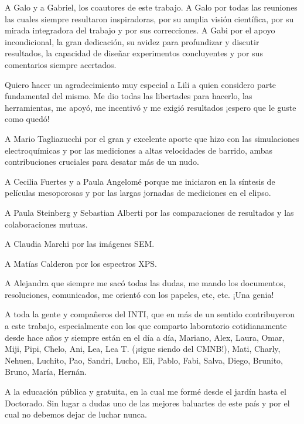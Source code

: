 \begin{myindentpar}{0.5cm}

A Galo y a Gabriel, los coautores de este trabajo. A Galo por todas las reuniones las cuales siempre resultaron inspiradoras, por su amplia visión científica, por su mirada integradora del trabajo y por sus correcciones. \linebreak A Gabi por el apoyo incondicional, la gran dedicación, su avidez para profundizar y discutir resultados, la capacidad de diseñar experimentos concluyentes y por sus comentarios siempre acertados.

Quiero hacer un agradecimiento muy especial a Lili a quien considero parte fundamental del mismo. Me dio todas las libertades para hacerlo, las herramientas, me apoyó, me incentivó y me exigió resultados ¡espero que le guste como quedó!

A Mario Tagliazucchi por el gran y excelente aporte que hizo con las simulaciones electroquímicas y por las mediciones a altas velocidades de barrido, ambas contribuciones cruciales para desatar más de un nudo.  

A Cecilia Fuertes y a Paula Angelomé porque me iniciaron en la síntesis de películas mesoporosas y por las largas jornadas de mediciones en el elipso.

A Paula Steinberg y Sebastian Alberti por las comparaciones de resultados y las colaboraciones mutuas.

A Claudia Marchi por las imágenes SEM.

A Matías Calderon por los espectros XPS.

A Alejandra que siempre me sacó todas las dudas, me mando los documentos, resoluciones, comunicados, me orientó con los papeles, etc, etc. ¡Una genia!

A toda la gente y compañeros del INTI, que en más de un sentido contribuyeron a este trabajo, especialmente con los que comparto laboratorio cotidianamente desde hace años y siempre están en el día a día, Mariano, Alex, Laura, Omar, Miji, Pipi, Chelo, Ani, Lea, Lea T. (¡sigue siendo del CMNB!), Mati, Charly, Nehuen, Luchito, Pao, Sandri, Lucho, Eli, Pablo, Fabi, Salva, Diego, Brunito, Bruno, María, Hernán.


A la educación pública y gratuita, en la cual me formé desde el jardín hasta el Doctorado. Sin lugar a dudas uno de las mejores baluartes de este país y por el cual no debemos dejar de luchar nunca. 

\pagebreak 

\thispagestyle{empty}	


\end{myindentpar}
